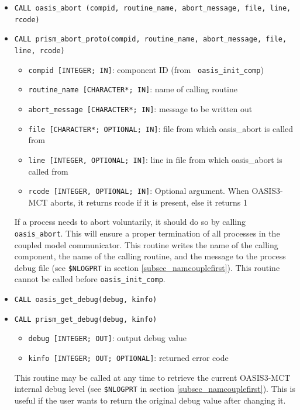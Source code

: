 \begin{itemize}
\item {\tt CALL oasis\_abort (compid, routine\_name, abort\_message, file, line, rcode)}
\item {\tt CALL prism\_abort\_proto(compid, routine\_name,
    abort\_message, file, line, rcode)}
  \begin{itemize}
  \item {\tt compid [INTEGER; IN]}: component ID (from {\tt
      oasis\_init\_comp})
  \item {\tt routine\_name [CHARACTER*; IN]}: name of calling routine
  \item {\tt abort\_message [CHARACTER*; IN]}: message to be written out
  \item {\tt file [CHARACTER*; OPTIONAL; IN]}: file from which oasis\_abort is called from
  \item {\tt line [INTEGER, OPTIONAL; IN]}: line in file from which oasis\_abort is called from
  \item {\tt rcode [INTEGER, OPTIONAL; IN]}: Optional argument. When OASIS3-MCT 
    aborts, it returns rcode if it is present, else it returns 1
  \end{itemize}

  If a process needs to abort voluntarily, it should do so by calling
  {\tt oasis\_abort}. This will ensure a proper termination of all
  processes in the coupled model communicator. This routine writes the
  name of the calling component, the name of the calling routine, and the
  message to the process debug file (see {\tt \$NLOGPRT} in section
  \ref{subsec_namcouplefirst}).  This routine cannot be called before
  {\tt oasis\_init\_comp}.

  \vspace{0.2cm}
\item {\tt CALL oasis\_get\_debug(debug, kinfo)}
\item {\tt CALL prism\_get\_debug(debug, kinfo)}
  \begin{itemize}
  \item {\tt debug [INTEGER; OUT]}: output debug value
  \item {\tt kinfo [INTEGER; OUT; OPTIONAL]}: returned error code
  \end{itemize}

  This routine may be called at any time to retrieve the current
  OASIS3-MCT internal debug level (see {\tt \$NLOGPRT} in section
  \ref{subsec_namcouplefirst}).  This is useful if the user wants to
  return the original debug value after changing it.


\end{itemize}
